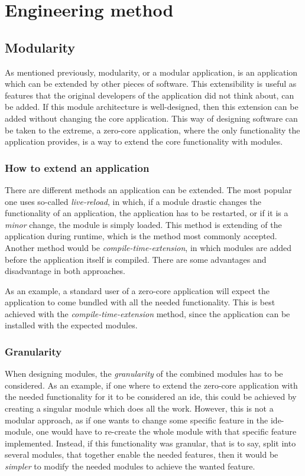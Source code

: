 \chapter{Engineering method}


\section{Modularity}

As mentioned previously, modularity, or a modular application, is an application
which can be extended by other pieces of software. This extensibility is useful
as features that the original developers of the application did not think about,
can be added. If this module architecture is well-designed, then this extension
can be added without changing the core application. This way of designing
software can be taken to the extreme, a zero-core application, where the only
functionality the application provides, is a way to extend the core functionality
with modules.


\subsection{How to extend an application}

There are different methods an application can be extended. The most popular one
 uses so-called \textit{live-reload}, in which, if a module
drastic changes the functionality of an application, the application has to be
restarted, or if it is a \textit{minor} change, the module is simply loaded.
This method is extending of the application during runtime, which is the method
most commonly accepted. Another method would be \textit{compile-time-extension},
in which modules are added before the application itself is compiled. There are
some advantages and disadvantage in both approaches.

As an example, a standard user of a zero-core application will expect the
application to come bundled with all the needed functionality. This is best
achieved with the \textit{compile-time-extension} method, since the application
can be installed with the expected modules.


\subsection{Granularity}

When designing modules, the \textit{granularity} of the combined modules has to
be considered. As an example, if one where to extend the zero-core application
with the needed functionality for it to be considered an \gls{ide}, this could be
achieved by creating a singular module which does all the work. However, this
is not a modular approach, as if one wants to change some specific feature in
the \gls{ide}-module, one would have to re-create the whole module with that
specific feature implemented. Instead, if this functionality was granular,
that is to say, split into several modules, that together enable the needed
features, then it would be \textit{simpler} to modify the needed modules to
achieve the wanted feature.


